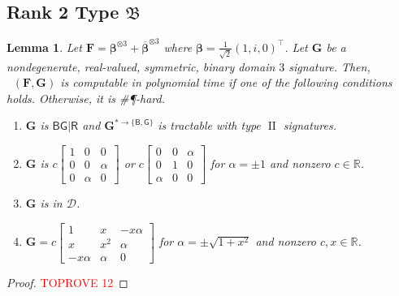 \documentclass[11pt]{article}
\newtheorem{lemma}[theorem]{Lemma}
\DeclareMathOperator{\holts}{Holant^*_3}
\DeclareMathOperator{\typeii}{II}
\newcommand{\db}{\mathsf{B}}
\newcommand{\dg}{\mathsf{G}}
\newcommand{\dr}{\mathsf{R}}
\newcommand{\sph}{\#\P-hard\xspace}
\newcommand{\teh}{^{\otimes 3}}
\newcommand{\transpose}{^\intercal}
\newcommand{\domres}[1]{
  ^{*\to\{#1\}}
}
\newcommand{\ternarytractz}{$\mathfrak{B}$\xspace}
\begin{document}
\subsection{Rank 2 Type \texorpdfstring{\ternarytractz}{B}}
\begin{lemma}\label{lem:dichotomy-single-ternary-rank-2-z-single-binary}
  Let $\mathbf{F} = \boldsymbol{\beta}\teh + \overline{\boldsymbol{\beta}}\teh$ where $\boldsymbol{\beta} = \frac{1}{\sqrt{2}}(1, i, 0)\transpose$.
  Let $\mathbf{G}$ be a nondegenerate, real-valued, symmetric, binary domain $3$ signature.
  Then, $\holts(\mathbf{F}, \mathbf{G})$ is computable in polynomial time if one of the following conditions holds. Otherwise, it is \sph.
  \begin{enumerate}
    \item $\mathbf{G}$ is $\db \dg | \dr$ and $\mathbf{G}\domres{\db, \dg}$ is tractable with type $\typeii$ signatures.
    \item $\mathbf{G}$ is $c \begin{bmatrix}
        1 & 0 & 0 \\
        0 & 0 & \alpha \\
        0 & \alpha & 0
        \end{bmatrix}$ or $c \begin{bmatrix}
        0 & 0 & \alpha \\
        0 & 1 & 0 \\
        \alpha & 0 & 0
      \end{bmatrix}$ for $\alpha = \pm 1$ and nonzero $c \in \mathbb{R}$.
    \item $\mathbf{G}$ is in $\mathcal{D}$.
    \item $\mathbf{G} = c  \begin{bmatrix}
        1 & x & -x \alpha \\
        x & x^2 & \alpha \\
        -x \alpha & \alpha & 0
      \end{bmatrix}$ for $\alpha = \pm \sqrt{1 + x^2}$ and nonzero $c, x \in \mathbb{R}$.
  \end{enumerate}
\end{lemma}
\begin{proof}\textcolor{red}{TOPROVE 12}\end{proof}
\end{document}
